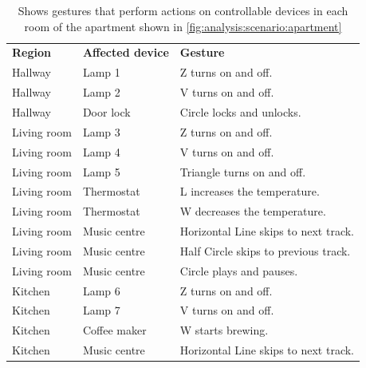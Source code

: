 \begin{table}[]
\centering
\caption{Shows gestures that perform actions on controllable devices in each room of the apartment shown in \cref{fig:analysis:scenario:apartment}}
\label{tbl:analysis:scenario:gesture-configurations}
\begin{tabular}{lll}
\textbf{Region} & \textbf{Affected device} & \textbf{Gesture}                       \\
Hallway                    & Lamp 1                              & Z turns on and off.                      \\
Hallway                    & Lamp 2                              & V turns on and off.                      \\
Hallway                    & Door lock                           & Circle locks and unlocks.                \\
Living room                & Lamp 3                              & Z turns on and off.                      \\
Living room                & Lamp 4                              & V turns on and off.                      \\
Living room                & Lamp 5                              & Triangle turns on and off.               \\
Living room                & Thermostat                          & L increases the temperature.             \\
Living room                & Thermostat                          & W decreases the temperature.             \\
Living room                & Music centre                        & Horizontal Line skips to next track.     \\
Living room                & Music centre                        & Half Circle skips to previous track.     \\
Living room                & Music centre                        & Circle plays and pauses.                 \\
Kitchen                    & Lamp 6                              & Z turns on and off.                      \\
Kitchen                    & Lamp 7                              & V turns on and off.                      \\
Kitchen                    & Coffee maker                        & W starts brewing.                        \\
Kitchen                    & Music centre                        & Horizontal Line skips to next track.     \\

\end{tabular}
\end{table}
